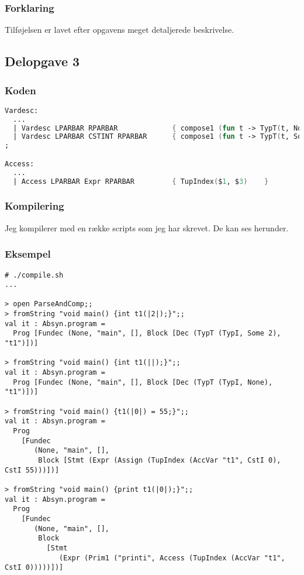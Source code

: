 \subsubsection{Forklaring}
Tilføjelsen er lavet efter opgavens meget detaljerede beskrivelse.

\subsection{Delopgave 3}\label{ass:3-3}
\subsubsection{Koden}
\begin{lstlisting}[language=fsharp]
Vardesc: 
  ...
  | Vardesc LPARBAR RPARBAR             { compose1 (fun t -> TypT(t, None)) $1    }
  | Vardesc LPARBAR CSTINT RPARBAR      { compose1 (fun t -> TypT(t, Some $3)) $1 }
;

Access:
  ...
  | Access LPARBAR Expr RPARBAR         { TupIndex($1, $3)    }   
\end{lstlisting}

\subsubsection{Kompilering}
Jeg kompilerer med en række scripts som jeg har skrevet. De kan ses herunder.









\subsubsection{Eksempel}
\begin{lstlisting}
# ./compile.sh
...

> open ParseAndComp;;
> fromString "void main() {int t1(|2|);}";;
val it : Absyn.program =
  Prog [Fundec (None, "main", [], Block [Dec (TypT (TypI, Some 2), "t1")])]

> fromString "void main() {int t1(||);}";;
val it : Absyn.program =
  Prog [Fundec (None, "main", [], Block [Dec (TypT (TypI, None), "t1")])]

> fromString "void main() {t1(|0|) = 55;}";;
val it : Absyn.program =
  Prog
    [Fundec
       (None, "main", [],
        Block [Stmt (Expr (Assign (TupIndex (AccVar "t1", CstI 0), CstI 55)))])]

> fromString "void main() {print t1(|0|);}";;
val it : Absyn.program =
  Prog
    [Fundec
       (None, "main", [],
        Block
          [Stmt
             (Expr (Prim1 ("printi", Access (TupIndex (AccVar "t1", CstI 0)))))])]
\end{lstlisting}

